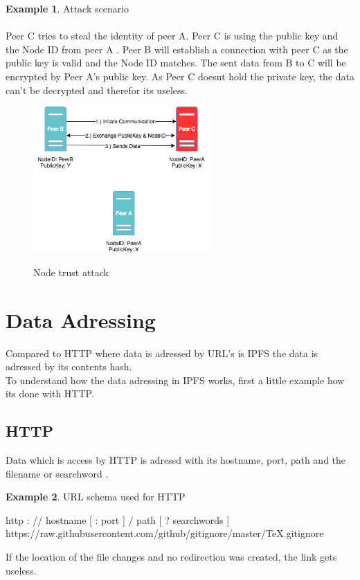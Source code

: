 \documentclass[a4paper,11pt, oneside]{report}
\theoremstyle{definition}
\newtheorem{exmp}{Example}[subsection]
\begin{document}
\begin{exmp}  Attack scenario\\ \\
Peer C tries to steal the identity of peer A. Peer C is using the public key and the Node ID from peer A . Peer B will establish a connection with peer C as the public key is valid and the Node ID matches. The sent data from B to C will be encrypted by Peer A's public key. As Peer C doesnt hold the private key, the data can't be decrypted and therefor its useless.
\begin{figure}[H]
\centering
\includegraphics[width=0.6\textwidth]{img/ipfs_peertrust_scenario_attack.png}\\[0.8cm]
\caption[Node trust attack]{Node trust attack}
\end{figure}
\end{exmp}

\newpage
\section{Data Adressing}
Compared to HTTP where data is adressed by URL's is IPFS the data is adressed by its contents hash.\\
To understand how the data adressing in IPFS works, first a little example how its done with HTTP.
\subsection{HTTP}
Data which is access by HTTP is adressd with its hostname, port, path and the filename or searchword \cite{HTTPAdressing}.
\begin{exmp} URL schema used for HTTP
\noindent
\begin{center}
http : // hostname [ : port ] / path [ ? searchwords ]\\
https://raw.githubusercontent.com/github/gitignore/master/TeX.gitignore
\end{center}
\end{exmp}
\noindent
If the location of the file changes and no redirection was created, the link gets useless.
\noindent
\end{document}

